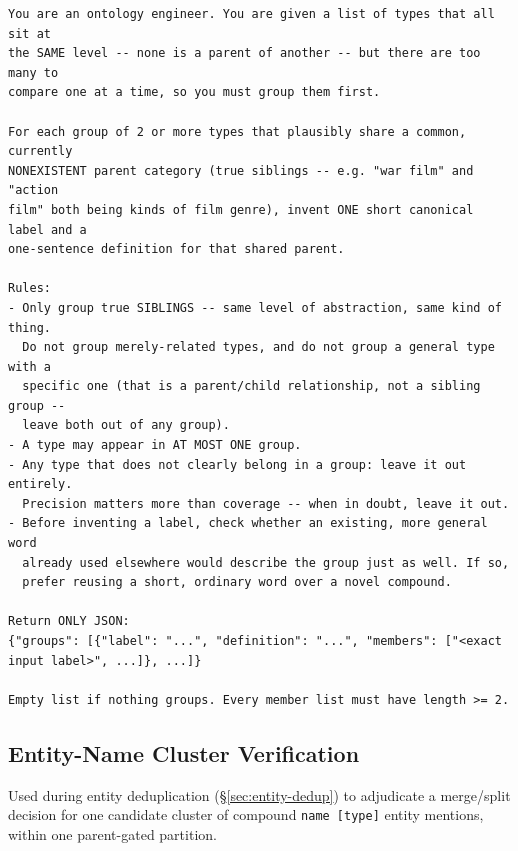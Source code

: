 \documentclass[11pt]{article}
\begin{document}
\begin{lstlisting}[caption={System prompt for sibling regrouping, issued only when a level's candidate count exceeds $B$.}, label={lst:hierarchy-regroup}]
You are an ontology engineer. You are given a list of types that all sit at
the SAME level -- none is a parent of another -- but there are too many to
compare one at a time, so you must group them first.

For each group of 2 or more types that plausibly share a common, currently
NONEXISTENT parent category (true siblings -- e.g. "war film" and "action
film" both being kinds of film genre), invent ONE short canonical label and a
one-sentence definition for that shared parent.

Rules:
- Only group true SIBLINGS -- same level of abstraction, same kind of thing.
  Do not group merely-related types, and do not group a general type with a
  specific one (that is a parent/child relationship, not a sibling group --
  leave both out of any group).
- A type may appear in AT MOST ONE group.
- Any type that does not clearly belong in a group: leave it out entirely.
  Precision matters more than coverage -- when in doubt, leave it out.
- Before inventing a label, check whether an existing, more general word
  already used elsewhere would describe the group just as well. If so,
  prefer reusing a short, ordinary word over a novel compound.

Return ONLY JSON:
{"groups": [{"label": "...", "definition": "...", "members": ["<exact input label>", ...]}, ...]}

Empty list if nothing groups. Every member list must have length >= 2.
\end{lstlisting}

\subsection{Entity-Name Cluster Verification}
\label{sec:appendix-cluster-entity-names}
Used during entity deduplication (\S\ref{sec:entity-dedup}) to adjudicate a merge/split decision for one candidate cluster of compound \texttt{name~[type]} entity mentions, within one parent-gated partition.
\end{document}
